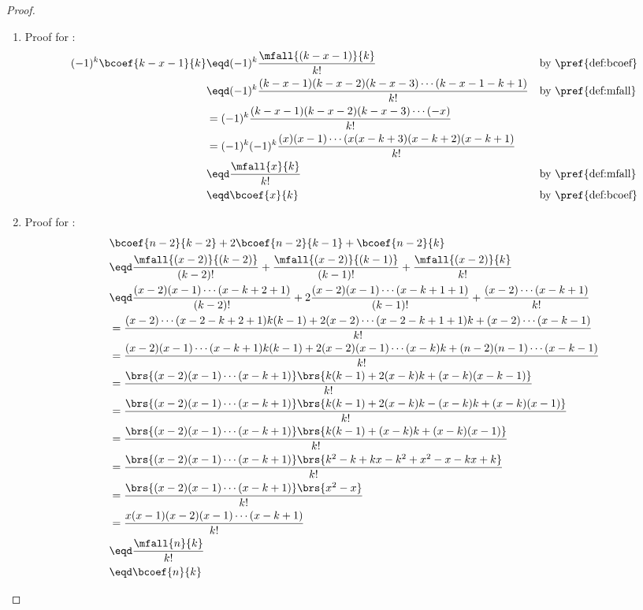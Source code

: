 \begin{proof}
\begin{enumerate}
  \item Proof for :
    \begin{align*}
      (-1)^k\bcoef{k-x-1}{k}
        &\eqd (-1)^k\frac{\mfall{(k-x-1)}{k}}{k!}
        &&    \text{by \pref{def:bcoef}}
      \\&\eqd (-1)^k\frac{(k-x-1)(k-x-2)(k-x-3)\cdots(k-x-1-k+1)}{k!}
        &&    \text{by \pref{def:mfall}}
      \\&=    (-1)^k\frac{(k-x-1)(k-x-2)(k-x-3)\cdots(-x)}{k!}
      \\&=    (-1)^k(-1)^k\frac{(x)(x-1)\cdots(x(x-k+3)(x-k+2)(x-k+1)}{k!}
      \\&\eqd \frac{\mfall{x}{k}}{k!}
        &&    \text{by \pref{def:mfall}}
      \\&\eqd \bcoef{x}{k}
        &&    \text{by \pref{def:bcoef}}
    \end{align*}

  \item Proof for :
    \begin{align*}
      &\bcoef{n-2}{k-2}+2\bcoef{n-2}{k-1}+\bcoef{n-2}{k}
      \\&\eqd \frac{\mfall{(x-2)}{(k-2)}}{(k-2)!} + \frac{\mfall{(x-2)}{(k-1)}}{(k-1)!} + \frac{\mfall{(x-2)}{k}}{k!}
      \\&\eqd \frac{(x-2)(x-1)\cdots(x-k+2+1)}{(k-2)!} + 2\frac{(x-2)(x-1)\cdots(x-k+1+1)}{(k-1)!} + \frac{(x-2)\cdots(x-k+1)}{k!}
      \\&=    \frac{(x-2)\cdots(x-2-k+2+1)k(k-1) + 2(x-2)\cdots(x-2-k+1+1)k + (x-2)\cdots(x-k-1)}{k!}
      \\&=    \frac{(x-2)(x-1)\cdots(x-k+1)k(k-1) + 2(x-2)(x-1)\cdots(x-k)k + (n-2)(n-1)\cdots(x-k-1)}{k!}
      \\&=    \frac{\brs{(x-2)(x-1)\cdots(x-k+1)}\brs{k(k-1) + 2(x-k)k + (x-k)(x-k-1)}}{k!}
      \\&=    \frac{\brs{(x-2)(x-1)\cdots(x-k+1)}\brs{k(k-1) + 2(x-k)k - (x-k)k + (x-k)(x-1)}}{k!}
      \\&=    \frac{\brs{(x-2)(x-1)\cdots(x-k+1)}\brs{k(k-1) + (x-k)k + (x-k)(x-1)}}{k!}
      \\&=    \frac{\brs{(x-2)(x-1)\cdots(x-k+1)}\brs{k^2-k + kx -k^2 + x^2-x-kx+k}}{k!}
      \\&=    \frac{\brs{(x-2)(x-1)\cdots(x-k+1)}\brs{x^2-x}}{k!}
      \\&=    \frac{x(x-1)(x-2)(x-1)\cdots(x-k+1)}{k!}
      \\&\eqd \frac{\mfall{n}{k}}{k!}
      \\&\eqd \bcoef{n}{k}
    \end{align*}


\end{enumerate}
\end{proof}
